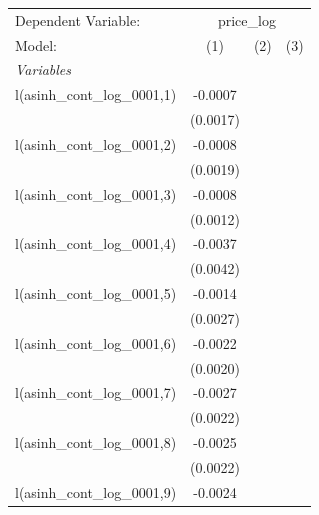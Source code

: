 \begingroup
\centering
\begin{tabular}{lccc}
   \tabularnewline \midrule \midrule
   Dependent Variable: & \multicolumn{3}{c}{price\_log}\\
   Model:                                      & (1)      & (2)                    & (3)\\  
   \midrule
   \emph{Variables}\\
   l(asinh\_cont\_log\_0001,1)                 & -0.0007  &                        &   \\   
                                               & (0.0017) &                        &   \\   
   l(asinh\_cont\_log\_0001,2)                 & -0.0008  &                        &   \\   
                                               & (0.0019) &                        &   \\   
   l(asinh\_cont\_log\_0001,3)                 & -0.0008  &                        &   \\   
                                               & (0.0012) &                        &   \\   
   l(asinh\_cont\_log\_0001,4)                 & -0.0037  &                        &   \\   
                                               & (0.0042) &                        &   \\   
   l(asinh\_cont\_log\_0001,5)                 & -0.0014  &                        &   \\   
                                               & (0.0027) &                        &   \\   
   l(asinh\_cont\_log\_0001,6)                 & -0.0022  &                        &   \\   
                                               & (0.0020) &                        &   \\   
   l(asinh\_cont\_log\_0001,7)                 & -0.0027  &                        &   \\   
                                               & (0.0022) &                        &   \\   
   l(asinh\_cont\_log\_0001,8)                 & -0.0025  &                        &   \\   
                                               & (0.0022) &                        &   \\   
   l(asinh\_cont\_log\_0001,9)                 & -0.0024  &                        &   \\   

\end{tabular}
